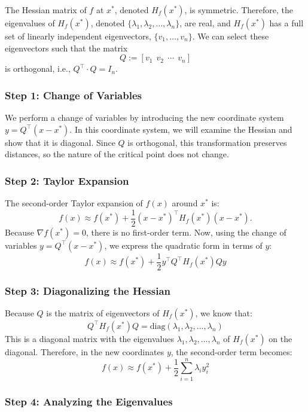 The Hessian matrix of $f$ at $x^\ast$, denoted $H_f(x^\ast)$, is symmetric. Therefore, the eigenvalues of $H_f(x^\ast)$, denoted $\{\lambda_1, \lambda_2, \ldots, \lambda_n\}$, are real, and $H_f(x^\ast)$ has a full set of linearly independent eigenvectors, $\{ v_1, \ldots, v_n \}$. We can select these eigenvectors such that the matrix
\[
Q := \left[ v_1 ~~ v_2 ~~ \cdots ~~ v_n \right]
\]
is orthogonal, i.e., $Q^\top \cdot Q = I_n$.

\subsubsection{ Step 1: Change of Variables}

We perform a change of variables by introducing the new coordinate system $y = Q^\top (x - x^\ast)$. In this coordinate system, we will examine the Hessian and show that it is diagonal. Since $Q$ is orthogonal, this transformation preserves distances, so the nature of the critical point does not change.

\subsubsection{ Step 2: Taylor Expansion}

The second-order Taylor expansion of $f(x)$ around $x^\ast$ is:
\[
f(x) \approx f(x^\ast) + \frac{1}{2} (x - x^\ast)^\top H_f(x^\ast) (x - x^\ast).
\]
Because $\nabla f(x^\ast) = 0$, there is no first-order term. Now, using the change of variables $y = Q^\top (x - x^\ast)$, we express the quadratic form in terms of $y$:
\[
f(x) \approx f(x^\ast) + \frac{1}{2} y^\top Q^\top H_f(x^\ast) Q y
\]

\subsubsection{ Step 3: Diagonalizing the Hessian}

Because $Q$ is the matrix of eigenvectors of $H_f(x^\ast)$, we know that:
\[
Q^\top H_f(x^\ast) Q = \text{diag}(\lambda_1, \lambda_2, \ldots, \lambda_n)
\]
This is a diagonal matrix with the eigenvalues $\lambda_1, \lambda_2, \ldots, \lambda_n$ of $H_f(x^\ast)$ on the diagonal. Therefore, in the new coordinates \( y \), the second-order term becomes:
\[
f(x) \approx f(x^\ast) + \frac{1}{2} \sum_{i=1}^n \lambda_i y_i^2
\]

\subsubsection{ Step 4: Analyzing the Eigenvalues}

